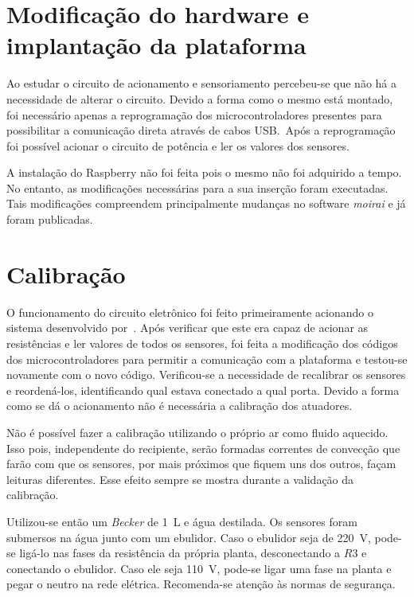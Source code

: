 \section{Modificação do hardware e implantação da plataforma}%
\label{sec:hardware-and-plataform}

Ao estudar o circuito de acionamento e sensoriamento percebeu-se que não há a
necessidade de alterar o circuito. Devido a forma como o mesmo está montado, foi
necessário apenas a reprogramação dos microcontroladores presentes para
possibilitar a comunicação direta através de cabos USB.\ Após a reprogramação
foi possível acionar o circuito de potência e ler os valores dos sensores.

A instalação do Raspberry não foi feita pois o mesmo não foi adquirido a tempo.
No entanto, as modificações necessárias para a sua inserção foram executadas.
Tais modificações compreendem principalmente mudanças no software
\textit{moirai} e já foram publicadas.

\section{Calibração}%
\label{sec:calibration}

O funcionamento do circuito eletrônico foi feito primeiramente acionando o
sistema desenvolvido por~\textcite{masterthesis:nelson}. Após verificar que este
era capaz de acionar as resistências e ler valores de todos os sensores, foi
feita a modificação dos códigos dos microcontroladores para permitir a
comunicação com a plataforma e testou-se novamente com o novo código.
Verificou-se a necessidade de recalibrar os sensores e reordená-los,
identificando qual estava conectado a qual porta. Devido a forma como se dá o
acionamento não é necessária a calibração dos atuadores.

Não é possível fazer a calibração utilizando o próprio ar como fluido aquecido.
Isso pois, independente do recipiente, serão formadas correntes de convecção que
farão com que os sensores, por mais próximos que fiquem uns dos outros, façam
leituras diferentes. Esse efeito sempre se mostra durante a validação da
calibração.

Utilizou-se então um \textit{Becker} de \SI{1}{\liter} e água destilada. Os
sensores foram submersos na água junto com um ebulidor. Caso o ebulidor seja de
\SI{220}{\volt}, pode-se ligá-lo nas fases da resistência da própria planta,
desconectando a \(R3\) e conectando o ebulidor. Caso ele seja \SI{110}{\volt},
pode-se ligar uma fase na planta e pegar o neutro na rede elétrica. Recomenda-se
atenção às normas de segurança.

